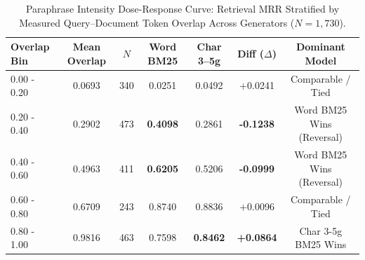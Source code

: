 \begin{table}[htbp]
\centering
\caption{Paraphrase Intensity Dose-Response Curve: Retrieval MRR Stratified by Measured Query--Document Token Overlap Across Generators ($N=1,730$).}
\label{tab:paraphrase_dose_response}
\small
\begin{tabular}{lcccccc}
\toprule
\textbf{Overlap Bin} & \textbf{Mean Overlap} & $N$ & \textbf{Word BM25} & \textbf{Char 3--5g} & \textbf{Diff ($\Delta$)} & \textbf{Dominant Model} \\
\midrule
0.00 - 0.20 & 0.0693 & 340 & 0.0251 & 0.0492 & +0.0241 & Comparable / Tied \\
0.20 - 0.40 & 0.2902 & 473 & \textbf{0.4098} & 0.2861 & \textbf{-0.1238} & Word BM25 Wins (Reversal) \\
0.40 - 0.60 & 0.4963 & 411 & \textbf{0.6205} & 0.5206 & \textbf{-0.0999} & Word BM25 Wins (Reversal) \\
0.60 - 0.80 & 0.6709 & 243 & 0.8740 & 0.8836 & +0.0096 & Comparable / Tied \\
0.80 - 1.00 & 0.9816 & 463 & 0.7598 & \textbf{0.8462} & \textbf{+0.0864} & Char 3-5g BM25 Wins \\
\bottomrule
\end{tabular}
\end{table}
